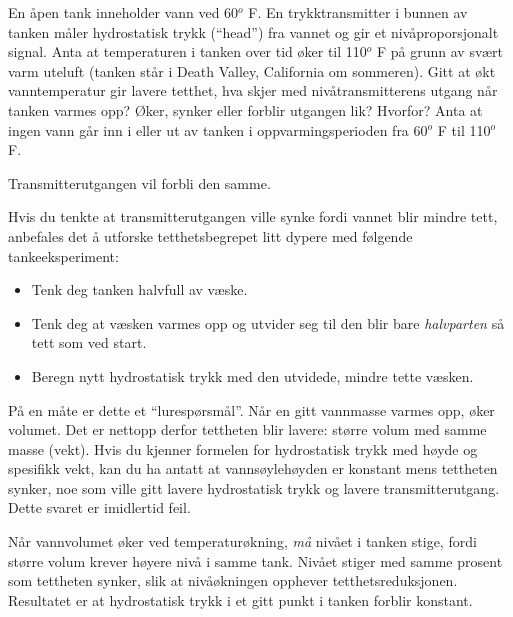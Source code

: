 

En åpen tank inneholder vann ved 60$^{o}$ F.  En trykktransmitter i bunnen av tanken måler hydrostatisk trykk (``head'') fra vannet og gir et nivåproporsjonalt signal.  Anta at temperaturen i tanken over tid øker til 110$^{o}$ F på grunn av svært varm uteluft (tanken står i Death Valley, California om sommeren).  Gitt at økt vanntemperatur gir lavere tetthet, hva skjer med nivåtransmitterens utgang når tanken varmes opp?  Øker, synker eller forblir utgangen lik?  Hvorfor?  Anta at ingen vann går inn i eller ut av tanken i oppvarmingsperioden fra 60$^{o}$ F til 110$^{o}$ F.







Transmitterutgangen vil forbli den samme.

\vskip 10pt

Hvis du tenkte at transmitterutgangen ville synke fordi vannet blir mindre tett, anbefales det å utforske tetthetsbegrepet litt dypere med følgende tankeeksperiment:

\begin{itemize}
\item{} Tenk deg tanken halvfull av væske.
\item{} Tenk deg at væsken varmes opp og utvider seg til den blir bare {\it halvparten} så tett som ved start.
\item{} Beregn nytt hydrostatisk trykk med den utvidede, mindre tette væsken.
\end{itemize}

På en måte er dette et ``lurespørsmål''.  Når en gitt vannmasse varmes opp, øker volumet.  Det er nettopp derfor tettheten blir lavere: større volum med samme masse (vekt).  Hvis du kjenner formelen for hydrostatisk trykk med høyde og spesifikk vekt, kan du ha antatt at vannsøylehøyden er konstant mens tettheten synker, noe som ville gitt lavere hydrostatisk trykk og lavere transmitterutgang.  Dette svaret er imidlertid feil.

Når vannvolumet øker ved temperaturøkning, {\it må} nivået i tanken stige, fordi større volum krever høyere nivå i samme tank.  Nivået stiger med samme prosent som tettheten synker, slik at nivåøkningen opphever tetthetsreduksjonen.  Resultatet er at hydrostatisk trykk i et gitt punkt i tanken forblir konstant.


